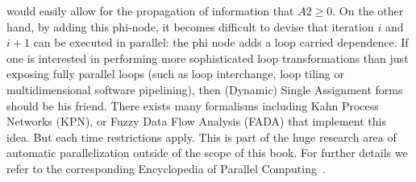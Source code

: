 would easily allow for the propagation of information that $A2\geq 0$. On the other hand, by adding this phi-node, it becomes difficult to devise that iteration $i$ and $i+1$ can be executed in parallel: the phi node adds a loop carried dependence. If one is interested in performing more sophisticated loop transformations than just exposing fully parallel loops (such as loop interchange, loop tiling or multidimensional software pipelining), then (Dynamic) Single Assignment forms should be his friend. There exists many formalisms including Kahn Process Networks (KPN), or Fuzzy Data Flow Analysis (FADA) that implement this idea. But each time restrictions apply. This is part of the huge research area of automatic parallelization outside of the scope of this book. For further details we refer to the corresponding Encyclopedia of Parallel Computing~\cite{Padua}.
